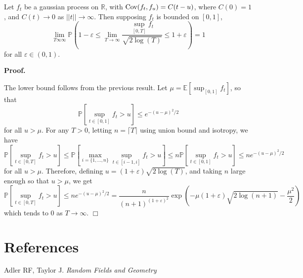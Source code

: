 \documentclass[11pt]{article}
\begin{document}
\begin{theorem}
Let $f_t$ be a gaussian process on $\mathbb{R}$, with $\text{Cov}(f_t,f_u)
= C(t-u)$, where $C(0) = 1$, and $C(t) \to 0$ as $||t|| \to \infty$.
Then supposing $f_t$ is bounded on $[0,1]$,
\[
\lim_{T \infty \infty }\mathbb{P}\left(1-\varepsilon \leq \lim_{T \to \infty}\frac{\sup_{[0,T]}
    f_t}{\sqrt{2 \log(T)}} \leq 1+\varepsilon
\right) = 1
\]
for all $\varepsilon \in (0,1)$.
\end{theorem}

\noindent\textbf{Proof.}

The lower bound follows from the previous result.
Let $\mu=\mathbb{E}[\sup_{[0,1]} f_t]$, so that
\[
\mathbb{P}[\sup_{t \in [0,1]} f_t > u] \leq e^{-(u-\mu)^2/2}
\]
for all $u > \mu$.
For any $T >0$, letting $n = \lceil T \rceil$ using union bound and isotropy, we have
\[
\mathbb{P}[\sup_{t \in [0,T]} f_t > u]  \leq \mathbb{P}[\max_{i = \{1,\hdots,n\}} \sup_{t \in [i-1,i]} f_t > u] \leq n\mathbb{P}[\sup_{t \in [0,1]} f_t > u] \leq ne^{-(u-\mu)^2/2}
\]
for all $u > \mu$.
Therefore, defining $u = (1+\varepsilon)\sqrt{2\log(T)}$, and taking $n$ large enough so that $u > \mu$, we get
\[
\mathbb{P}[\sup_{t \in [0,T]} f_t > u] \leq ne^{-(u-\mu)^2/2} = \frac{n}{(n+1)^{(1+\varepsilon)^2}}\exp\left(-\mu (1+\varepsilon)\sqrt{2\log(n+1)} - \frac{\mu^2}{2}\right)
\]
which tends to 0 as $T \to \infty$. $\Box$


\section{References}

Adler RF, Taylor J. \emph{Random Fields and Geometry}
\end{document}
